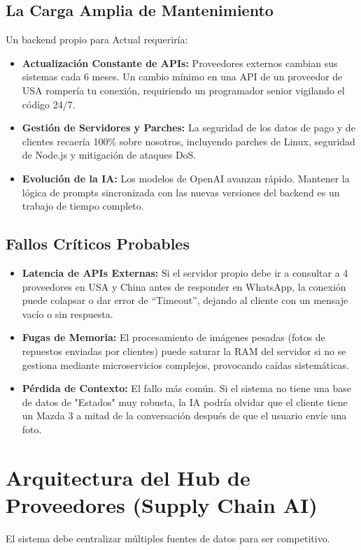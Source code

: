 \documentclass[12pt,a4paper]{article}
\begin{document}
\subsection{La Carga Amplia de Mantenimiento}
Un backend propio para Actual requeriría:
\begin{itemize}
    \item \textbf{Actualización Constante de APIs:} Proveedores externos cambian sus sistemas cada 6 meses. Un cambio mínimo en una API de un proveedor de USA rompería tu conexión, requiriendo un programador senior vigilando el código 24/7.
    \item \textbf{Gestión de Servidores y Parches:} La seguridad de los datos de pago y de clientes recaería 100\% sobre nosotros, incluyendo parches de Linux, seguridad de Node.js y mitigación de ataques DoS.
    \item \textbf{Evolución de la IA:} Los modelos de OpenAI avanzan r\'apido. Mantener la lógica de prompts sincronizada con las nuevas versiones del backend es un trabajo de tiempo completo.
\end{itemize}

\subsection{Fallos Críticos Probables}
\begin{itemize}
    \item \textbf{Latencia de APIs Externas:} Si el servidor propio debe ir a consultar a 4 proveedores en USA y China antes de responder en WhatsApp, la conexión puede colapsar o dar error de ``Timeout'', dejando al cliente con un mensaje vacío o sin respuesta.
    \item \textbf{Fugas de Memoria:} El procesamiento de imágenes pesadas (fotos de repuestos enviadas por clientes) puede saturar la RAM del servidor si no se gestiona mediante microservicios complejos, provocando caídas sistemáticas.
    \item \textbf{Pérdida de Contexto:} El fallo más común. Si el sistema no tiene una base de datos de "Estados" muy robusta, la IA podría olvidar que el cliente tiene un Mazda 3 a mitad de la conversación después de que el usuario envíe una foto.
\end{itemize}

\newpage

\section{Arquitectura del Hub de Proveedores (Supply Chain AI)}
El sistema debe centralizar múltiples fuentes de datos para ser competitivo.
\end{document}
